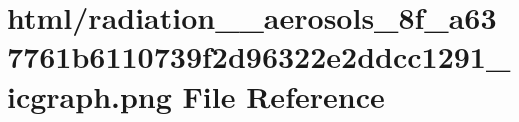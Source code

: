 \hypertarget{radiation____aerosols__8f__a637761b6110739f2d96322e2ddcc1291__icgraph_8png}{}\section{html/radiation\+\_\+\+\_\+aerosols\+\_\+8f\+\_\+a637761b6110739f2d96322e2ddcc1291\+\_\+icgraph.png File Reference}
\label{radiation____aerosols__8f__a637761b6110739f2d96322e2ddcc1291__icgraph_8png}
